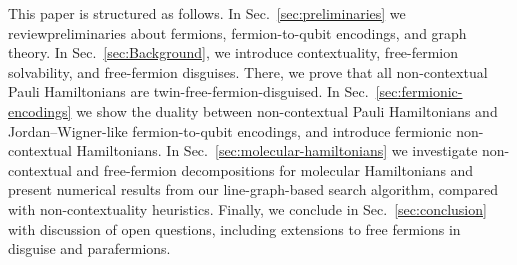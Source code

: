 \documentclass[%
 aip,
 amsmath,amssymb,
 reprint,%
]{revtex4-1}
\begin{document}
\indent This paper is structured as follows. In Sec.~\ref{sec:preliminaries} we reviewpreliminaries about fermions, fermion-to-qubit encodings, and graph theory. In Sec.~\ref{sec:Background}, we introduce contextuality, free-fermion solvability, and free-fermion disguises. There, we prove that all non-contextual Pauli Hamiltonians are twin-free-fermion-disguised. In Sec.~\ref{sec:fermionic-encodings} we show the duality between non-contextual Pauli Hamiltonians and Jordan--Wigner-like fermion-to-qubit encodings, and introduce fermionic non-contextual Hamiltonians. In Sec.~\ref{sec:molecular-hamiltonians} we investigate non-contextual and free-fermion decompositions for molecular Hamiltonians and present numerical results from our line-graph-based search algorithm, compared with non-contextuality heuristics. Finally, we conclude in Sec.~\ref{sec:conclusion} with discussion of open questions, including extensions to free fermions in disguise and parafermions. 
\end{document}
